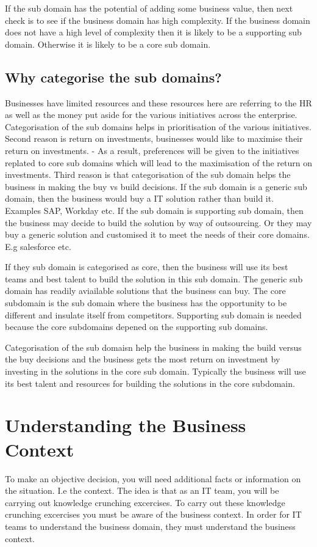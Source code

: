 \documentclass[a4paper, 11pt]{book}
\begin{document}
    If the sub domain has the potential of adding some business value, then next check is to see if the business domain has high complexity.
    If the business domain does not have a high level of complexity then it is likely to be a supporting sub domain.
    Otherwise it is likely to be a core sub domain.

    \subsection{Why categorise the sub domains?}
    Businesses have limited resources and these resources here are referring to the HR as well as the money put aside for the various initiatives across the enterprise.
    Categorisation of the sub domains helps in prioritisation of the various initiatives.
    Second reason is return on investments, businesses would like to maximise their return on investments.
    - As a result, preferences will be given to the initiatives replated to core sub domains which will lead to the maximisation of the return on investments.
    Third reason is that categorisation of the sub domain helps the business in making the buy vs build decisions.
    If the sub domain is a generic sub domain, then the business would buy a IT solution rather than build it.
    Examples SAP, Workday etc.
    If the sub domain is supporting sub domain, then the business may decide to build the solution by way of outsourcing.
    Or they may buy a generic solution and customised it to meet the needs of their core domains. E.g salesforce etc.

    If they sub domain is categorised as core, then the business will use its best teams and best talent to build the solution in this sub domain.
    The generic sub domain has readily aviailable solutions that the business can buy.
    The core subdomain is the sub domain where the business has the opportunity to be different and insulate itself from competitors.
    Supporting sub domain is needed because the core subdomains depened on the supporting sub domains.

    Categorisation of the sub domaisn help the business in making the build versus the buy decisions and the business gets the most return on investment by investing in the solutions in the core sub domain.
    Typically the business will use its best talent and resources for building the solutions in the core subdomain.

    \section{Understanding the Business Context}
    To make an objective decision, you will need additional facts or information on the situation. I.e the context.
    The idea is that as an IT team, you will be carrying out knowledge crunching excercises.
    To carry out these knowledge crunching excercises you must be aware of the business context.
    In order for IT teams to understand the business domain, they must understand the business context.
\end{document}
